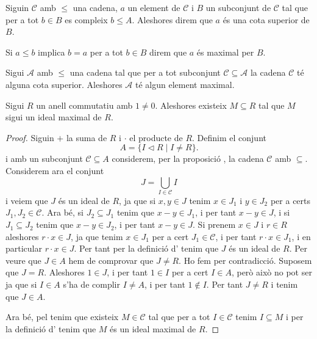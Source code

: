 \documentclass[../Apunts.tex]{subfiles}
\begin{document}
	\begin{definition}
		\label{def:cota superior d'una cadena}
		\label{def:element maximal d'una cadena}
		Siguin \(\mathcal{C}\) amb \(\leq\) una cadena, \(a\) un element de \(\mathcal{C}\) i \({B}\) un subconjunt de \(\mathcal{C}\) tal que per a tot \(b\in{B}\) es compleix \(b\leq A\). Aleshores direm que \(a\) és una cota superior de \({B}\).
		
		Si \(a\leq b\) implica \(b=a\) per a tot \(b\in{B}\) direm que \(a\) és maximal per \({B}\).
	\end{definition}
	\begin{axiom}
		\label{lema de Zorn}
		Sigui \(\mathcal{A}\) amb \(\leq\) una cadena tal que per a tot subconjunt \(\mathcal{C}\subseteq\mathcal{A}\) la cadena \(\mathcal{C}\) té alguna cota superior. Aleshores \(\mathcal{A}\) té algun element maximal.
	\end{axiom}
	\begin{theorem}
		\label{thm:ideal maximal exsiteix}
		Sigui \(R\) un anell commutatiu amb \(1\neq0\). Aleshores existeix \(M\subseteq R\) tal que \(M\) sigui un ideal maximal de \(R\).
		\begin{proof}
			Siguin \(+\) la suma de \(R\) i \(\cdot\) el producte de \(R\). Definim el conjunt
			\[A=\{I\triangleleft R\mid I\neq R\}.\]
			i amb un subconjunt \(\mathcal{C}\subseteq A\) considerem, per la proposició , la cadena \(\mathcal{C}\) amb \(\subseteq\). Considerem ara el conjunt
			\[J=\bigcup_{I\in\mathcal{C}}I\]
			i veiem que \(J\) és un ideal de \(R\), ja que si \(x,y\in J\) tenim \(x\in J_{1}\) i \(y\in J_{2}\) per a certs \(J_{1},J_{2}\in\mathcal{C}\). Ara bé, si \(J_{2}\subseteq J_{1}\) tenim que \(x-y\in J_{1}\), i per tant \(x-y\in J\), i si \(J_{1}\subseteq J_{2}\) tenim que \(x-y\in J_{2}\), i per tant \(x-y\in J\). Si prenem \(x\in J\) i \(r\in R\) aleshores \(r\cdot x\in J\), ja que tenim \(x\in J_{1}\) per a cert \(J_{1}\in\mathcal{C}\), i per tant \(r\cdot x\in J_{1}\), i en particular \(r\cdot x\in J\). Per tant per la definició d' tenim que \(J\) és un ideal de \(R\). Per veure que \(J\in A\) hem de comprovar que \(J\neq R\). Ho fem per contradicció. Suposem que \(J=R\). Aleshores \(1\in J\), i per tant \(1\in I\) per a cert \(I\in A\), però això no pot ser ja que si \(I\in A\) s'ha de complir \(I\neq A\), i per tant \(1\notin I\). Per tant \(J\neq R\) i tenim que \(J\in A\).
			
			Ara bé, pel  tenim que existeix \(M\in\mathcal{C}\) tal que per a tot \(I\in\mathcal{C}\) tenim \(I\subseteq M\) i per la definició d' tenim que \(M\) és un ideal maximal de \(R\).
		\end{proof}
	\end{theorem}
\end{document}
